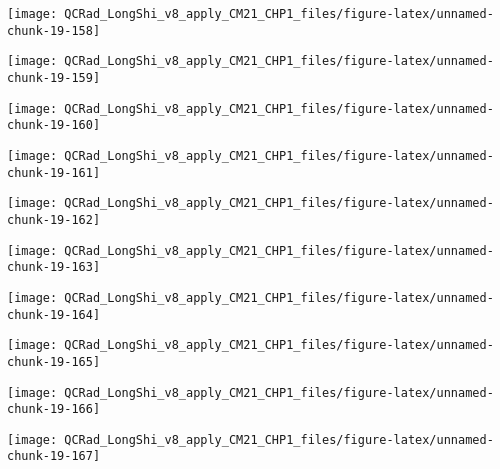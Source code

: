 \documentclass[
  10pt,
  a4paper,oneside]{article}
\begin{document}
\begin{center}\texttt{[image: QCRad\_LongShi\_v8\_apply\_CM21\_CHP1\_files/figure-latex/unnamed-chunk-19-158]} \end{center}

\begin{center}\texttt{[image: QCRad\_LongShi\_v8\_apply\_CM21\_CHP1\_files/figure-latex/unnamed-chunk-19-159]} \end{center}

\begin{center}\texttt{[image: QCRad\_LongShi\_v8\_apply\_CM21\_CHP1\_files/figure-latex/unnamed-chunk-19-160]} \end{center}

\begin{center}\texttt{[image: QCRad\_LongShi\_v8\_apply\_CM21\_CHP1\_files/figure-latex/unnamed-chunk-19-161]} \end{center}

\begin{center}\texttt{[image: QCRad\_LongShi\_v8\_apply\_CM21\_CHP1\_files/figure-latex/unnamed-chunk-19-162]} \end{center}

\begin{center}\texttt{[image: QCRad\_LongShi\_v8\_apply\_CM21\_CHP1\_files/figure-latex/unnamed-chunk-19-163]} \end{center}

\begin{center}\texttt{[image: QCRad\_LongShi\_v8\_apply\_CM21\_CHP1\_files/figure-latex/unnamed-chunk-19-164]} \end{center}

\begin{center}\texttt{[image: QCRad\_LongShi\_v8\_apply\_CM21\_CHP1\_files/figure-latex/unnamed-chunk-19-165]} \end{center}

\begin{center}\texttt{[image: QCRad\_LongShi\_v8\_apply\_CM21\_CHP1\_files/figure-latex/unnamed-chunk-19-166]} \end{center}

\begin{center}\texttt{[image: QCRad\_LongShi\_v8\_apply\_CM21\_CHP1\_files/figure-latex/unnamed-chunk-19-167]} \end{center}
\end{document}
